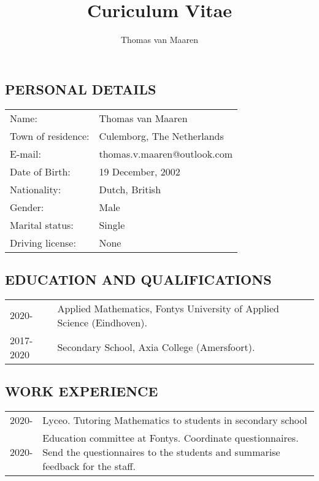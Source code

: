 \documentclass{article}
\title{Curiculum Vitae}
\author{Thomas van Maaren}
\begin{document}
\maketitle
\subsection{PERSONAL DETAILS}

\begin{tabular}{l l}

	Name:			&	Thomas van Maaren \\
	Town of residence:	&	Culemborg, The Netherlands \\
	E-mail:			&	thomas.v.maaren@outlook.com \\
	Date of Birth:		&	19 December, 2002 \\
	Nationality:		&       Dutch, British \\
	Gender:			&	Male \\
	Marital status:		&	Single \\
	Driving license:	&	None \\

\end{tabular}

\subsection{EDUCATION AND QUALIFICATIONS}

\begin{tabular}{l p{10cm}}
	2020-		&Applied Mathematics, Fontys University of Applied Science (Eindhoven).\\
	2017-2020	&Secondary School, Axia College (Amersfoort).\\

\end{tabular}

\subsection{WORK EXPERIENCE}

\begin{tabular}{l p{10cm}}
	2020-		&Lyceo. Tutoring Mathematics to students in secondary school\\
	2020-		&Education committee at Fontys. Coordinate
			questionnaires. Send the questionnaires to the students and summarise
			feedback for the staff.\\
\end{tabular}
\end{document}
